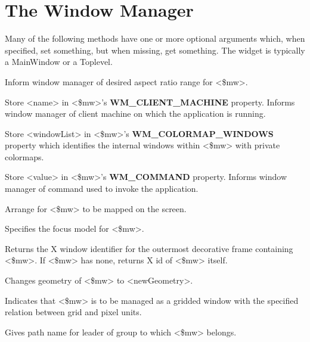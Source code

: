 
\section{The Window Manager}

Many of the following methods have one or more optional arguments
which, when specified, set something, but when missing, get something.
The widget is typically a MainWindow or a Toplevel.

\begin{enum}{1cm}

Inform window manager of desired aspect ratio range for <\$mw>.

Store <name> in <\$mw>'s {\bf WM\_CLIENT\_MACHINE} property. Informs
window manager of client machine on which the application is running.

Store <windowList> in <\$mw>'s {\bf WM\_COLORMAP\_WINDOWS} property
which identifies the internal windows within <\$mw> with private
colormaps.

Store <value> in <\$mw>'s {\bf WM\_COMMAND} property. Informs window manager
of command used to invoke the application.

Arrange for <\$mw> to be mapped on the screen.

Specifies the focus model for <\$mw>.

Returns the X window identifier for the outermost decorative frame
containing <\$mw>. If <\$mw> has none, returns X id of <\$mw> itself.

Changes geometry of <\$mw> to <newGeometry>.

Indicates that <\$mw> is to be managed as a gridded window with the
specified relation between grid and pixel units.

Gives path name for leader of group to which <\$mw> belongs.


\end{enum}
